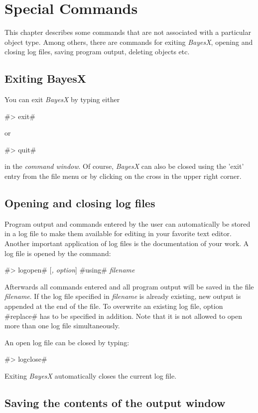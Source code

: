 \chapter{Special Commands}

This chapter describes some commands that are not associated with
a particular object type. Among others, there are commands for
exiting {\em BayesX}, opening and closing log files, saving
program output, deleting objects etc.

\section{Exiting BayesX}

You can exit {\em BayesX} by typing either

#> exit#

or

#> quit#

in the {\em command window}. Of course, {\em BayesX} can also be
closed using the 'exit' entry from the file menu or by clicking on
the cross in the upper right corner.

\section{Opening and closing log files} \label{logfile}

Program output and commands entered by the user can automatically
be stored in a log file to make them available for editing in your
favorite text editor. Another important application of log files
is the documentation of your work. A log file is opened by the
command:

#> logopen# [{\em, option}] #using# {\em filename}

Afterwards all commands entered and all program output will be
saved in the file {\em filename}. If the log file specified in
{\em filename} is already existing, new output is appended at the
end of the file. To overwrite an existing log file, option
#replace# has to be specified in addition. Note that it is not
allowed to open more than one log file simultaneously.

An open log file can be closed by typing:

#> logclose#

Exiting {\em BayesX} automatically closes the current log file.

\section{Saving the contents of the output window}
 

